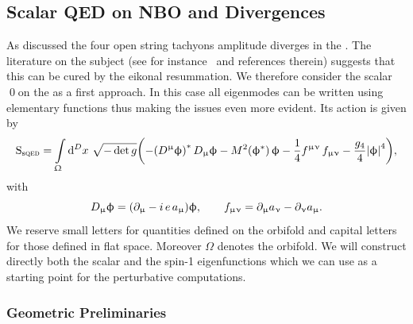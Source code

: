 \subsection{Scalar QED on NBO and Divergences} 
\label{sec:NOscalarQED}

As discussed the four open string tachyons amplitude diverges in the \nbo.
The literature on the subject (see for instance~\cite{Cornalba:2004:TimedependentOrbifoldsString} and references therein) suggests that this can be cured by the eikonal resummation.
We therefore consider the scalar \qed on the \nbo as a first approach.
In this case all eigenmodes can be written using elementary functions thus making the issues even more evident.
Its action is given by
\begin{equation}
  \mathrm{S}_{\text{s}\textsc{qed}}
  =
  \int\limits_{\Upomega} \dd[D]{x}\,
  \sqrt{- \det g}
  \qty(
    - \qty(D^{\upmu} \upphi)^*\, D_{\upmu} \upphi
    - M^2  \qty(\upphi^*)\, \upphi
    - \frac{1}{4} f^{\upmu\upnu}\, f_{\upmu\upnu}
    - \frac{g_4}{4} \abs{\upphi}^4
  ),
\end{equation}
with
\begin{equation}
  D_{\upmu} \upphi
  =
  \qty(\partial_{\upmu} -i\, e\,  a_{\upmu}) \upphi,
  \qquad
  f_{\upmu\upnu}
  =
  \partial_{\upmu} a_{\upnu} - \partial_{\upnu} a_{\upmu}.
\end{equation}
We reserve small letters for quantities defined on the orbifold and capital letters for those defined in flat space.
Moreover $\Omega$ denotes the orbifold.
We will construct directly both the scalar and the spin-1 eigenfunctions  which we can use as a starting point for the perturbative computations.


\subsubsection{Geometric Preliminaries}
\label{sec:geometric_preliminaries_nbo}

